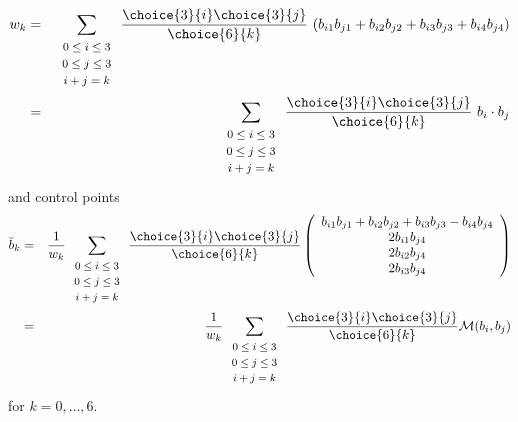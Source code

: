 \documentclass[11pt]{article}
\begin{document}
\begin{eqnarray}
\label{eq:weights}
w_k & = & \sum_{\begin{array}{c} \mbox{\footnotesize{$0 \leq i \leq 3$}} \\ 
			     \mbox{\footnotesize{$0 \leq j \leq 3$}} \\ 
			     \mbox{\footnotesize{$i+j=k$}}
			     \end{array}}
        \frac{\choice{3}{i} \choice{3}{j}}{\choice{6}{k}}
	\ (b_{i1} b_{j1} + b_{i2} b_{j2} + b_{i3} b_{j3} + b_{i4} b_{j4}) \nonumber \\
& = & \sum_{\begin{array}{c} \mbox{\footnotesize{$0 \leq i \leq 3$}} \\ 
			     \mbox{\footnotesize{$0 \leq j \leq 3$}} \\ 
			     \mbox{\footnotesize{$i+j=k$}}
			     \end{array}}
        \frac{\choice{3}{i} \choice{3}{j}}{\choice{6}{k}}
	\ b_i \cdot b_j
\end{eqnarray}
and control points 
\begin{eqnarray}
\label{eq:control-pts}
\breve{b}_k & = & \frac{1}{w_k} 
      \sum_{\begin{array}{c} \mbox{\footnotesize{$0 \leq i \leq 3$}} \\ 
			     \mbox{\footnotesize{$0 \leq j \leq 3$}} \\ 
			     \mbox{\footnotesize{$i+j=k$}}
			     \end{array}} 
        \frac{\choice{3}{i} \choice{3}{j}}{\choice{6}{k}}
	\left( \begin{array}{c}
            b_{i1} b_{j1} + b_{i2} b_{j2} + b_{i3} b_{j3} - b_{i4} b_{j4} \\
            2b_{i1} b_{j4} \\
            2b_{i2} b_{j4} \\
            2b_{i3} b_{j4} 
	\end{array} \right) \nonumber \\
& = & \frac{1}{w_k} 
      \sum_{\begin{array}{c} \mbox{\footnotesize{$0 \leq i \leq 3$}} \\ 
			     \mbox{\footnotesize{$0 \leq j \leq 3$}} \\ 
			     \mbox{\footnotesize{$i+j=k$}}
			     \end{array}} 
        \frac{\choice{3}{i} \choice{3}{j}}{\choice{6}{k}}
{\cal M}(b_i, b_j)
\end{eqnarray}
for $k = 0, \ldots, 6$.
\end{document}
